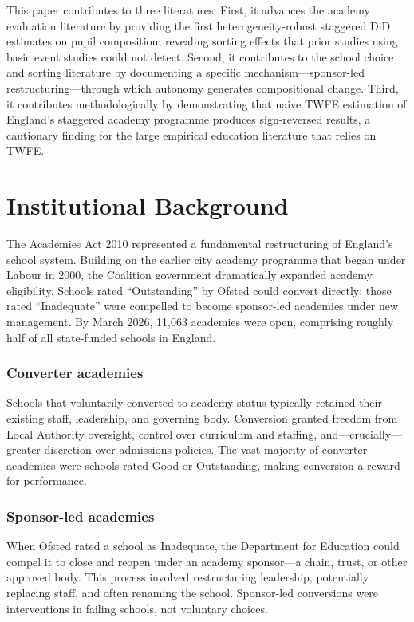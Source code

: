 \documentclass[12pt]{article}
\begin{document}
This paper contributes to three literatures. First, it advances the academy evaluation literature \citep{eyles2016,andrews2017} by providing the first heterogeneity-robust staggered DiD estimates on pupil composition, revealing sorting effects that prior studies using basic event studies could not detect. Second, it contributes to the school choice and sorting literature \citep{hsieh2003,epple2006,nechyba2006} by documenting a specific mechanism---sponsor-led restructuring---through which autonomy generates compositional change. Third, it contributes methodologically by demonstrating that naive TWFE estimation of England's staggered academy programme produces sign-reversed results, a cautionary finding for the large empirical education literature that relies on TWFE.

\section{Institutional Background}

The Academies Act 2010 represented a fundamental restructuring of England's school system. Building on the earlier city academy programme that began under Labour in 2000, the Coalition government dramatically expanded academy eligibility. Schools rated ``Outstanding'' by Ofsted could convert directly; those rated ``Inadequate'' were compelled to become sponsor-led academies under new management. By March 2026, 11,063 academies were open, comprising roughly half of all state-funded schools in England.

\subsubsection*{Converter academies} Schools that voluntarily converted to academy status typically retained their existing staff, leadership, and governing body. Conversion granted freedom from Local Authority oversight, control over curriculum and staffing, and---crucially---greater discretion over admissions policies. The vast majority of converter academies were schools rated Good or Outstanding, making conversion a reward for performance.

\subsubsection*{Sponsor-led academies} When Ofsted rated a school as Inadequate, the Department for Education could compel it to close and reopen under an academy sponsor---a chain, trust, or other approved body. This process involved restructuring leadership, potentially replacing staff, and often renaming the school. Sponsor-led conversions were interventions in failing schools, not voluntary choices.
\end{document}
